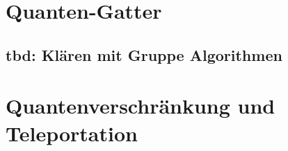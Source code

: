 
\section{Quanten-Gatter}
\subsection{tbd: Klären mit Gruppe Algorithmen}

\section{Quantenverschränkung und Teleportation}

